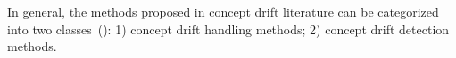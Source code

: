 \documentclass[twoside,11pt]{article}
\begin{document}



In general, the methods proposed in concept drift literature can be categorized into two classes~(\cite{tsymbal2004problem}): 1) concept drift handling methods; 2) concept drift detection methods.
\end{document}
